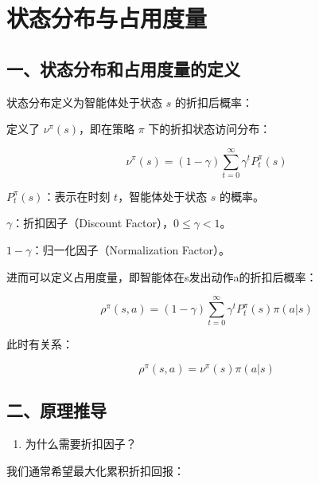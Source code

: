 \setcounter{section}{2}

\hypertarget{ux72b6ux6001ux5206ux5e03ux4e0eux5360ux7528ux5ea6ux91cf}{%
\section{状态分布与占用度量}\label{ux72b6ux6001ux5206ux5e03ux4e0eux5360ux7528ux5ea6ux91cf}}

\hypertarget{ux4e00ux72b6ux6001ux5206ux5e03ux548cux5360ux7528ux5ea6ux91cfux7684ux5b9aux4e49}{%
\subsection{一、状态分布和占用度量的定义}\label{ux4e00ux72b6ux6001ux5206ux5e03ux548cux5360ux7528ux5ea6ux91cfux7684ux5b9aux4e49}}

状态分布定义为智能体处于状态 \(s\) 的折扣后概率：

定义了 \(\nu^\pi(s)\)，即在策略 \(\pi\) 下的折扣状态访问分布：

\[
\nu^\pi(s) = (1-\gamma)\sum_{t=0}^{\infty}\gamma^t P_t^\pi(s)
\]

\(P_t^\pi(s)\)：表示在时刻 \(t\)，智能体处于状态 \(s\) 的概率。

\(\gamma\)：折扣因子（Discount Factor），\(0 \le \gamma < 1\)。

\(1-\gamma\)：归一化因子（Normalization Factor）。

进而可以定义占用度量，即智能体在s发出动作a的折扣后概率：

\[
\rho^\pi(s,a) = (1-\gamma)\sum_{t=0}^{\infty}\gamma^t P_t^\pi(s)\pi(a|s)
\]

此时有关系：

\[
\rho^\pi(s,a) = \nu^\pi(s)\pi(a|s)
\]

\hypertarget{ux4e8cux539fux7406ux63a8ux5bfc}{%
\subsection{二、原理推导}\label{ux4e8cux539fux7406ux63a8ux5bfc}}

\begin{enumerate}
\def\labelenumi{\arabic{enumi}.}
\tightlist
\item
  为什么需要折扣因子？
\end{enumerate}

我们通常希望最大化累积折扣回报：

